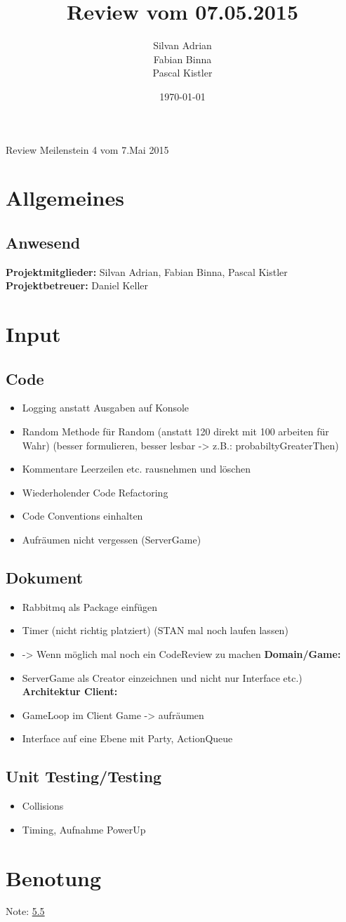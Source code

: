 \documentclass[11pt]{scrartcl}
\title{Review vom 07.05.2015}
\author{Silvan Adrian \\ Fabian Binna \\ Pascal Kistler}
\date{\today{}}
\begin{document}
{\huge Review Meilenstein 4 vom 7.Mai 2015}

\section{Allgemeines}
\label{sec:Allgemein}

\subsection{Anwesend}
\label{sec:Anwesend}
\textbf{Projektmitglieder:} Silvan Adrian, Fabian Binna, Pascal Kistler \\
\textbf{Projektbetreuer:} Daniel Keller
\section{Input}
\subsection{Code}
\begin{itemize}
 \item Logging anstatt Ausgaben auf Konsole
 \item Random Methode für Random (anstatt 120 direkt mit 100 arbeiten für Wahr) (besser formulieren, besser lesbar -> z.B.: probabiltyGreaterThen)
 \item Kommentare Leerzeilen etc. rausnehmen und löschen
 \item Wiederholender Code Refactoring
 \item Code Conventions einhalten
 \item Aufräumen nicht vergessen (ServerGame)
\end{itemize}

\subsection{Dokument}
\begin{itemize}
  \item Rabbitmq als Package einfügen
  \item Timer (nicht richtig platziert) (STAN mal noch laufen lassen) 
  \item -> Wenn möglich mal noch ein CodeReview zu machen
  \newline
  \textbf{Domain/Game:} 
  \item ServerGame als Creator einzeichnen und 
  nicht nur Interface etc.)
  \newline
  \textbf{Architektur Client:}
  \item GameLoop im Client Game -> aufräumen
  \item Interface auf eine Ebene mit Party, ActionQueue
\end{itemize}

\subsection{Unit Testing/Testing}
\begin{itemize}
   \item Collisions
   \item Timing, Aufnahme PowerUp
\end{itemize}


\section{Benotung}
\label{sec:Benotung}
Note: \underline {5.5}
\end{document}
